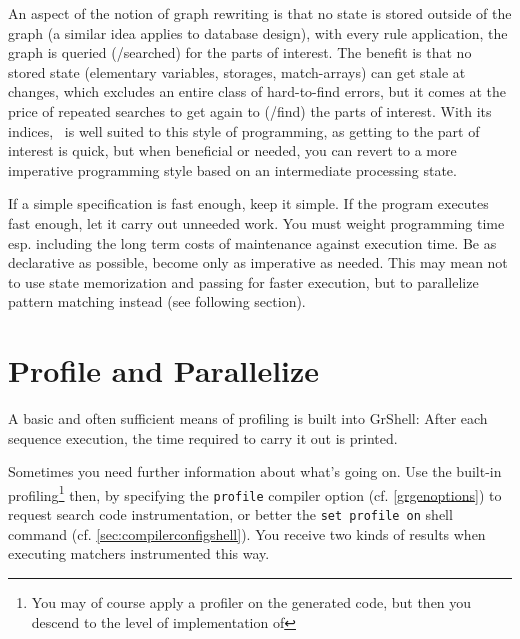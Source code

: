 \begin{note}
An aspect of the notion of graph rewriting is that no state is stored outside of the graph (a similar idea applies to database design), 
with every rule application, the graph is queried (/searched) for the parts of interest.
The benefit is that no stored state (elementary variables, storages, match-arrays) can get stale at changes,
which excludes an entire class of hard-to-find errors,
but it comes at the price of repeated searches to get again to (/find) the parts of interest.
With its indices, \GrG~is well suited to this style of programming, as getting to the part of interest is quick, but when beneficial or needed, you can revert to a more imperative programming style based on an intermediate processing state.
\end{note}

\pagebreak

\begin{note}
If a simple specification is fast enough, keep it simple.
If the program executes fast enough, let it carry out unneeded work.
You must weight programming time esp. including the long term costs of maintenance against execution time.
Be as declarative as possible, become only as imperative as needed.
This may mean not to use state memorization and passing for faster execution, but to parallelize pattern matching instead (see following section).
\end{note}


\section{Profile and Parallelize}\label{sec:performanceparallel}

A basic and often sufficient means of profiling is built into GrShell:
After each sequence execution, the time required to carry it out is printed.

Sometimes you need further information about what's going on.
Use the built-in profiling\footnote{You may of course apply a profiler on the generated code, but then you descend to the level of implementation of \GrG} then, by specifying the \texttt{profile} compiler option (cf. \ref{grgenoptions}) to request search code instrumentation, or better the \texttt{set profile on} shell command (cf. \ref{sec:compilerconfigshell}).
You receive two kinds of results when executing matchers instrumented this way.

